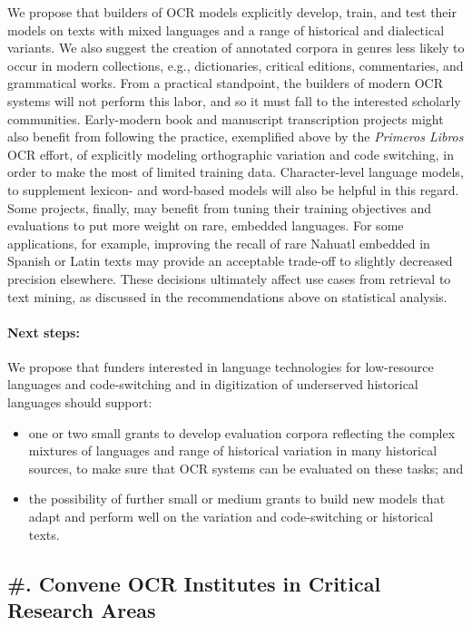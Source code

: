\documentclass[twoside,11pt]{report}
\newcounter{reccounter}
\renewcommand{\thereccounter}{\arabic{reccounter}}
\newcommand{\recommend}[2]{\refstepcounter{reccounter}%
  \label{rec:#1}%
  \subsection{\#\thereccounter. #2}%
  \label{sec:rec-#1}}
\begin{document}
We propose that builders of OCR models explicitly develop, train, and test their models on texts with mixed languages and a range of historical and dialectical variants. We also suggest the creation of annotated corpora in genres less likely to occur in modern collections, e.g., dictionaries, critical editions, commentaries, and grammatical works. From a practical standpoint, the builders of modern OCR systems will not perform this labor, and so it must fall to the interested scholarly communities. Early-modern book and manuscript transcription projects might also benefit from following the practice, exemplified above by the \emph{Primeros Libros} OCR effort, of explicitly modeling orthographic variation and code switching, in order to make the most of limited training data. Character-level language models, to supplement lexicon- and word-based models will also be helpful in this regard. Some projects, finally, may benefit from tuning their training objectives and evaluations to put more weight on rare, embedded languages. For some applications, for example, improving the recall of rare Nahuatl embedded in Spanish or Latin texts may provide an acceptable trade-off to slightly decreased precision elsewhere. These decisions ultimately affect use cases from retrieval to text mining, as discussed in the recommendations above on statistical analysis.

\paragraph{Next steps:} We propose that funders interested in language technologies for low-resource languages and code-switching and in digitization of underserved historical languages should support:
\begin{itemize}

\item one or two small grants to develop evaluation corpora reflecting the complex mixtures of languages and range of historical variation in many historical sources, to make sure that OCR systems can be evaluated on these tasks; and

\item the possibility of further small or medium grants to build new models that adapt and perform well on the variation and code-switching or historical texts.

\end{itemize}

\recommend{institutes}{Convene OCR Institutes in Critical Research Areas}
\end{document}
